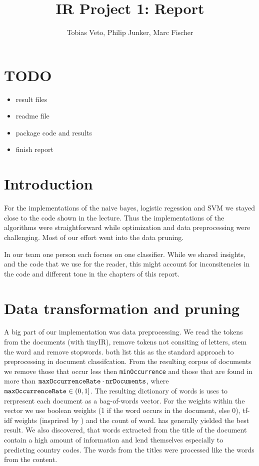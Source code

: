 \documentclass{article}
\title{IR Project 1: Report}
\author{Tobias Veto, Philip Junker, Marc Fischer}
\begin{document}
\section*{TODO}
\begin{itemize}
	\item result files
	\item readme file
	\item package code and results
	\item finish report
\end{itemize}

 
\section*{Introduction}
For the implementations of the naive bayes, logistic regession and SVM we stayed close to the code shown in the lecture. Thus the implementations of the algorithms were straightforward while optimization and data preprocessing were challenging. Most of our effort went into the data pruning.

In our team one person each focues on one classifier. While we shared insights, and the code that we use for the reader, this might account for inconsitencies in the code and different tone in the chapters of this report.


\section*{Data transformation and pruning}
A big part of our implementation was data preprocessing. We read the tokens from the documents (with tinyIR), remove tokens not consiting of letters, stem the word and remove stopwords. \cite{joachims_text_1998,ozgur_text_2005} both list this as the standard approach to preprocessing in document classifcation. From the resulting corpus of documents we remove those that occur less then \texttt{minOccurrence} and those that are found in more than $\text{\texttt{maxOccurrenceRate}} \cdot \text{\texttt{nrDocuments}}$, where $\text{\texttt{maxOccurrenceRate}} \in (0, 1]$.
The resulting dictionary of words is uses to rerpresent each document as a bag-of-words vector. For the weights within the vector we use boolean weights (1 if the word occurs in the document, else 0), tf-idf weights (insprired by \cite{ozgur_text_2005}) and the count of word.   has generally yielded the best result.
We also discovered, that words extracted from the title of the document contain a high amount of information and lend themselves especially to predicting country codes. The words from the titles were processed like the words from the content.
\end{document}
